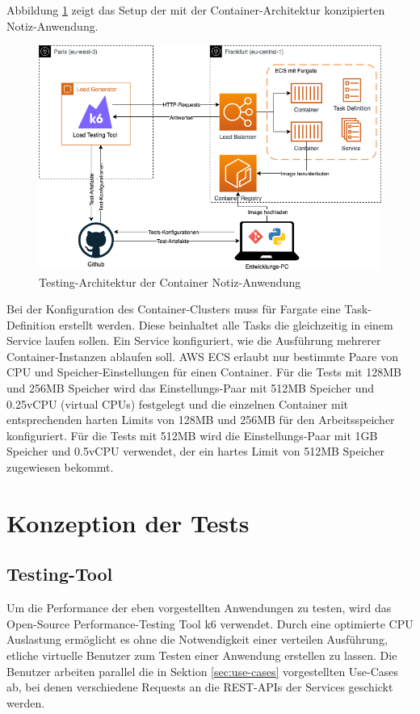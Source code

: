 Abbildung \ref{fig:fargate-testing-architektur} zeigt das Setup der mit der Container-Architektur konzipierten Notiz-Anwendung.

\begin{figure}[H]
    \includegraphics[width=\textwidth]{img/fargate-testing-architektur.png}
    \caption[Testing-Architektur der Container Notiz-Anwendung]{Testing-Architektur der Container Notiz-Anwendung}
    \label{fig:fargate-testing-architektur}
\end{figure}

Bei der Konfiguration des Container-Clusters muss für Fargate eine Task-Definition erstellt werden. Diese beinhaltet alle Tasks die gleichzeitig in einem Service laufen sollen. Ein Service konfiguriert, wie die Ausführung mehrerer Container-Instanzen ablaufen soll. AWS ECS erlaubt nur bestimmte Paare von CPU und Speicher-Einstellungen für einen Container. Für die Tests mit 128MB und 256MB Speicher wird das Einstellungs-Paar mit 512MB Speicher und 0.25vCPU (virtual CPUs) festgelegt und die einzelnen Container mit entsprechenden harten Limits von 128MB und 256MB für den Arbeitsspeicher konfiguriert. Für die Tests mit 512MB wird die Einstellungs-Paar mit 1GB Speicher und 0.5vCPU verwendet, der ein hartes Limit von 512MB Speicher zugewiesen bekommt.

\section{Konzeption der Tests}

\subsection{Testing-Tool}
Um die Performance der eben vorgestellten Anwendungen zu testen, wird das Open-Source Performance-Testing Tool k6 \cite{noauthor_load_nodate} verwendet. Durch eine optimierte CPU Auslastung ermöglicht es ohne die Notwendigkeit einer verteilen Ausführung, etliche virtuelle Benutzer zum Testen einer Anwendung erstellen zu lassen\cite{noauthor_running_nodate}. Die Benutzer arbeiten parallel die in Sektion \ref{sec:use-cases} vorgestellten Use-Cases ab, bei denen verschiedene Requests an die REST-APIs der Services geschickt werden. 

